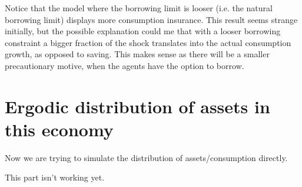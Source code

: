 \documentclass[letter,11pt]{article}
\begin{document}
Notice that the model where the borrowing limit is looser (i.e. the natural borrowing limit) displays more consumption insurance. This result seems strange initially, but the possible explanation could me that with a looser borrowing constraint a bigger fraction of the shock translates into the actual consumption growth, as opposed to saving. This makes sense as there will be a smaller precautionary motive, when  the agents have the option to borrow.

\section{Ergodic distribution of assets in this economy}
\hfill

Now we are trying to simulate the distribution of assets/consumption directly. 

This part isn't working yet.

\clearpage
 

\clearpage
 

\clearpage

\end{document}
